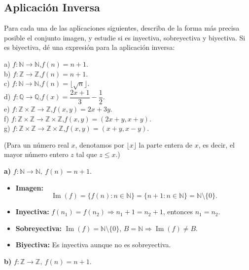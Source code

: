 \documentclass[a4paper,12pt]{article}
\begin{document}
\subsection{Aplicación Inversa}

\begin{ejercicio}[title=Ejercicio 19]
Para cada una de las aplicaciones siguientes, describa de la forma más precisa posible el conjunto imagen, y estudie si es inyectiva, sobreyectiva y biyectiva. Si es biyectiva, dé una expresión para la aplicación inversa:

a) $f:\mathbb{N}\to\mathbb{N}$,\quad $f(n)=n+1$.\\[4pt]
b) $f:\mathbb{Z}\to\mathbb{Z}$,\quad $f(n)=n+1$.\\[4pt]
c) $f:\mathbb{N}\to\mathbb{N}$,\quad $f(n)=\lfloor\sqrt{n}\rfloor$.\\[4pt]
d) $f:\mathbb{Q}\to\mathbb{Q}$,\quad $f(x)=\dfrac{2x+1}{3}-\dfrac{1}{2}$.\\[4pt]
e) $f:\mathbb{Z}\times\mathbb{Z}\to\mathbb{Z}$,\quad $f(x,y)=2x+3y$.\\[4pt]
f) $f:\mathbb{Z}\times\mathbb{Z}\to\mathbb{Z}\times\mathbb{Z}$,\quad $f(x,y)=(2x+y,x+y)$.\\[4pt]
g) $f:\mathbb{Z}\times\mathbb{Z}\to\mathbb{Z}\times\mathbb{Z}$,\quad $f(x,y)=(x+y,x-y)$.

\vspace{0.5em}

(Para un número real $x$, denotamos por $\lfloor x\rfloor$ la parte entera de $x$, es decir, el mayor número entero $z$ tal que $z\le x$.)
\tcblower

\textbf{a) } $f:\mathbb{N}\to\mathbb{N},\ f(n)=n+1$.

\begin{itemize}
  \item \textbf{Imagen:} 
  \[
    \operatorname{Im}(f) = \{f(n) : n \in \mathbb{N}\} = \{n+1 : n \in \mathbb{N}\} = \boxed{\mathbb{N} \setminus \{0\}}.
  \]
  \item \textbf{Inyectiva:} $f(n_1)=f(n_2)\Rightarrow n_1+1=n_2+1$, entonces $n_1=n_2$. 
  \item \textbf{Sobreyectiva:} $\operatorname{Im}(f) = \mathbb{N} \setminus \{0\}$, $B = \mathbb{N} \Rightarrow \operatorname{Im}(f) \ne B$. 
  \item \textbf{Biyectiva:} Es inyectiva aunque no es sobreyectiva. 
\end{itemize}

\textbf{b) } $f:\mathbb{Z}\to\mathbb{Z},\ f(n)=n+1$.


\end{ejercicio}
\end{document}
